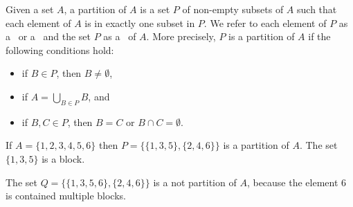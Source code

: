 \begin{flex}
\label{grp:def:bg::sets-and-relations::set-partition}

\begin{definition}
\label{def:bg::sets-and-relations::set-partition}
Given a set $A$, a partition of $A$ is a set $P$ of non-empty subsets
of $A$ such that each element of $A$ is in exactly one subset in $P$.
We refer to each element of $P$ as a~ or a~ and
the set $P$ as a~ of $A$.
More precisely, $P$ is a partition of $A$ if the following conditions
hold:
\begin{itemize}
\item if $B \in P$, then $B \not= \emptyset$,
\item if $A = \bigcup_{B \in P}{B}$, and
\item if $B, C \in P$, then $B = C$ or $B \cap C = \emptyset$.
\end{itemize}

\end{definition}

\begin{example}
\label{xmpl:bg::sets-and-relations::contained}
If $A = \{1, 2, 3, 4, 5, 6 \}$ then $P = \{ \{1,3,5\}, \{2, 4, 6\} \}$
is a partition of $A$.  The set $\{1,3,5\}$ is a block.

The set $Q = \{ \{1,3,5,6\}, \{2, 4, 6\} \}$ is a not partition of
$A$, because the element $6$ is contained multiple blocks.

\end{example}
\end{flex}

